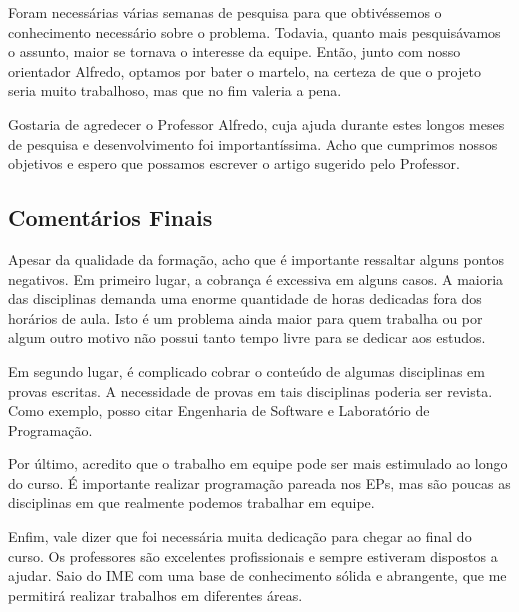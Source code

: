 Foram necessárias várias semanas de pesquisa para que obtivéssemos o conhecimento necessário sobre o
problema. Todavia, quanto mais pesquisávamos o assunto, maior se tornava o interesse da equipe.
Então, junto com nosso orientador Alfredo, optamos por bater o martelo, na certeza de que o projeto
seria muito trabalhoso, mas que no fim valeria a pena.

Gostaria de agredecer o Professor Alfredo, cuja ajuda durante estes longos meses de pesquisa e
desenvolvimento foi importantíssima. Acho que cumprimos nossos objetivos e espero que possamos
escrever o artigo sugerido pelo Professor.

\subsection{Comentários Finais}

Apesar da qualidade da formação, acho que é importante ressaltar alguns pontos negativos. Em
primeiro lugar, a cobrança é excessiva em alguns casos. A maioria das disciplinas demanda uma
enorme quantidade de horas dedicadas fora dos horários de aula. Isto é um problema ainda maior para
quem trabalha ou por algum outro motivo não possui tanto tempo livre para se dedicar aos estudos.

Em segundo lugar, é complicado cobrar o conteúdo de algumas disciplinas em provas escritas. A
necessidade de provas em tais disciplinas poderia ser revista. Como exemplo, posso citar Engenharia
de Software e Laboratório de Programação.

Por último, acredito que o trabalho em equipe pode ser mais estimulado ao longo do curso. É
importante realizar programação pareada nos EPs, mas são poucas as disciplinas em que
realmente podemos trabalhar em equipe.

Enfim, vale dizer que foi necessária muita dedicação para chegar ao final do curso. Os professores
são excelentes profissionais e sempre estiveram dispostos a ajudar. Saio do IME com uma base de
conhecimento sólida e abrangente, que me permitirá realizar trabalhos em diferentes áreas.


